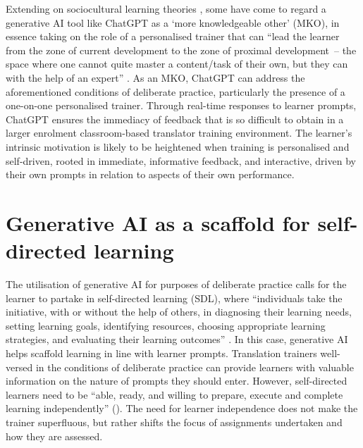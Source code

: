 \documentclass[output=paper]{langscibook}
\begin{document}
Extending on sociocultural learning theories \citep{vygotsky86}, some have come to regard a generative AI tool like ChatGPT as a ‘more knowledgeable other’ (MKO), in essence taking on the role of a personalised trainer that can “lead the learner from the zone of current development to the zone of proximal development~-- the space where one cannot quite master a content/task of their own, but they can with the help of an expert” \citep[2]{stojanov23}. As an MKO, ChatGPT can address the aforementioned conditions of deliberate practice, particularly the presence of a one-on-one personalised trainer. Through real-time responses to learner prompts, ChatGPT ensures the immediacy of feedback that is so difficult to obtain in a larger enrolment classroom-based translator training environment. The learner’s intrinsic motivation is likely to be heightened when training is personalised and self-driven, rooted in immediate, informative feedback, and interactive, driven by their own prompts in relation to aspects of their own performance.~

\section{Generative AI as a scaffold for self-directed learning}\label{sec:2:5}

The utilisation of generative AI for purposes of deliberate practice calls for the learner to partake in self-directed learning (SDL), where “individuals take the initiative, with or without the help of others, in diagnosing their learning needs, setting learning goals, identifying resources, choosing appropriate learning strategies, and evaluating their learning outcomes” \citep[18]{knowles75}. In this case, generative AI helps scaffold learning in line with learner prompts. Translation trainers well-versed in the conditions of deliberate practice can provide learners with valuable information on the nature of prompts they should enter. However, self-directed learners need to be “able, ready, and willing to prepare, execute and complete learning independently” (\citealt[419]{jossbergeretal10}). The need for learner independence does not make the trainer superfluous, but rather shifts the focus of assignments undertaken and how they are assessed.
\end{document}
